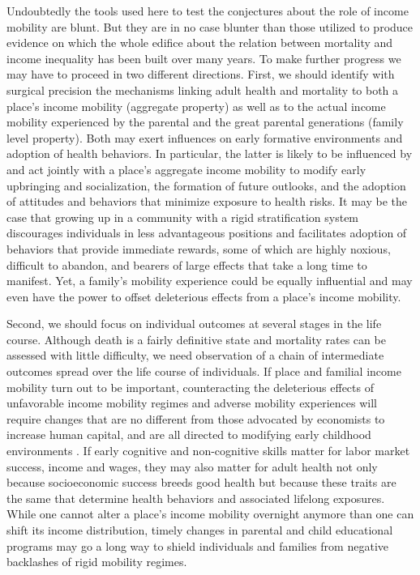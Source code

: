 \documentclass[11pt]{article}
\begin{document}
Undoubtedly the tools used here to test the conjectures about the role of income mobility are blunt. But they are in no case blunter than those utilized to produce evidence on which the whole edifice about the relation between mortality and income inequality has been built over many years. To make further progress we may have to proceed in two different directions. First, we should identify with surgical precision the mechanisms linking adult health and mortality to both a place's income mobility (aggregate property) as well as to the actual income mobility experienced by the parental and the great parental generations (family level property). Both may exert influences on early formative environments and adoption of health behaviors. In particular, the latter is likely to be influenced by and act jointly with a place's aggregate income mobility to modify early upbringing and socialization, the formation of future outlooks, and the adoption of attitudes and behaviors that minimize exposure to health risks. It may be the case that growing up in a community with a rigid stratification system discourages individuals in less advantageous positions and facilitates adoption of behaviors that provide immediate rewards, some of which are highly noxious, difficult to abandon, and bearers of large effects that take a long time to manifest. Yet, a family's mobility experience could be equally influential and may even have the power to offset deleterious effects from a place's income mobility.  

Second, we should focus on individual outcomes at several stages in the life course. Although death is a fairly definitive state and mortality rates can be assessed with little difficulty, we need observation of a chain of intermediate outcomes spread over the life course of individuals. If place and familial income mobility turn out to be important, counteracting the deleterious effects of unfavorable income mobility regimes and adverse mobility experiences will require changes that are no different from those advocated by economists to increase human capital, and are all directed to modifying early childhood environments \citep{Heckman2007}. If early cognitive and non-cognitive skills matter for labor market success, income and wages, they may also matter for adult health not only because socioeconomic success breeds good health but because these traits are the same that determine health behaviors and associated lifelong exposures. While one cannot alter a place's income mobility overnight anymore than one can shift its income distribution, timely changes in parental and child educational programs may go a long way to shield individuals and families from negative backlashes of rigid mobility regimes.
\end{document}
